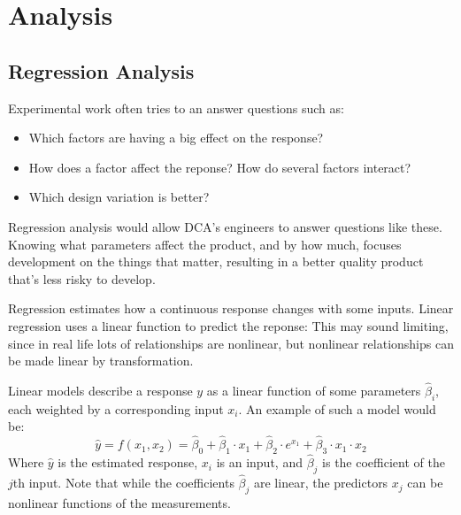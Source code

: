\documentclass[11pt,a4paper,article]{memoir} %
\begin{document}
\newpage
\section{Analysis}
\subsection*{Regression Analysis}
Experimental work often tries to an answer questions such as:
\vspace{-10pt}
\begin{itemize}
\item Which factors are having a big effect on the response?
\item How does a factor affect the reponse? How do several factors interact?
\item Which design variation is better?
\end{itemize}
\vspace{-10pt}
 Regression analysis would allow DCA's engineers to answer questions like these. Knowing what parameters affect the product, and by how much,  focuses development on the things that matter, resulting in a better quality product that's less risky to develop.
 \par
 Regression estimates how a continuous response changes with some inputs. Linear regression uses a linear function to predict the reponse: This may sound limiting, since in real life lots of relationships are nonlinear, but nonlinear relationships can be made linear by transformation.
\par
  Linear models describe a response $y$ as a linear function of some parameters $\hat{\beta}_i$, each weighted by a corresponding input $x_i$. An example of such a model would be:
\begin{equation}
	\hat{y} = f(x_1, x_2) = \hat{\beta}_0 + \hat{\beta}_1 \cdot x_1 + \hat{\beta}_2 \cdot e^{x_1}+ \hat{\beta}_3 \cdot x_1 \cdot x_2
\end{equation}
Where $\hat{y}$ is the estimated response, $x_i$ is an input, and $\hat{\beta}_j$ is the coefficient of the $j$th input. Note that while the coefficients $\hat{\beta}_j$ are linear, the predictors $x_j$ can be nonlinear functions of the measurements.
\end{document}
